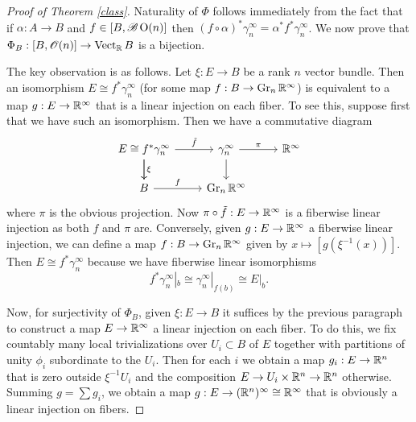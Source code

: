 \documentclass{amsart}
\DeclareMathOperator{\Vect}{Vect}
\begin{document}

\begin{proof}[Proof of Theorem \ref{class}]
    Naturality of $\Phi$ follows immediately from the fact that if $\alpha:A\to B$ and
    $f\in[B,\mathscr{B}\operatorname{O}(n)]$ then $(f\circ\alpha)^*\gamma_n^\infty=\alpha^*f^*\gamma_n^\infty$.
    We now prove that $\Phi_B:[B,\mathscr{O}(n)]\to\Vect_\R B$ is a bijection.

    The key observation is as follows.  Let $\xi:E\to B$ be a rank $n$ vector bundle. Then an isomorphism
    $E\cong f^*\gamma_n^\infty$ (for some map $f:B\to\operatorname{Gr}_n\mathbb{R}^\infty$) is equivalent to a map
    $g:E\to\mathbb{R}^\infty$ that is a linear injection on each fiber. To see this, suppose first that we have
    such an isomorphism. Then we have a commutative diagram
    \begin{equation*}
        \begin{tikzcd}
            E\ar{d}{\xi}\cong f^*\gamma_n^\infty\ar{d}\ar{r}{\tilde f}&\gamma_n^\infty\ar{r}{\pi}\ar{d} & \R^\infty\\
            B\ar{r}{f} & \Gr_n\R^\infty
        \end{tikzcd}
    \end{equation*}
    where $\pi$ is the obvious projection. Now $\pi\circ\tilde f:E\to\mathbb{R}^\infty$ is a fiberwise linear
    injection as both $f$ and $\pi$ are. Conversely, given $g:E\to\mathbb{R}^\infty$ a fiberwise linear
    injection, we can define a map $f:B\to\operatorname{Gr}_n\mathbb{R}^\infty$ given by $x\mapsto [g(\xi^{-1}(x))]$.
    Then $E\cong f^*\gamma_n^\infty$ because we have fiberwise linear isomorphisms
    \begin{equation*}
        f^*\gamma_n^\infty|_b \cong \gamma_n^\infty|_{f(b)}\cong E|_b.
    \end{equation*}

    Now, for surjectivity of $\Phi_B$, given $\xi:E\to B$ it suffices by the previous paragraph to
    construct a map $E\to\mathbb{R}^\infty$ a linear injection on each fiber. To do this, we fix countably
    many local trivializations over $U_i\subset B$ of $E$ together with partitions of unity $\phi_i$
    subordinate to the $U_i$. Then for each $i$ we obtain a map $g_i:E\to\mathbb{R}^n$ that is zero outside
    $\xi^{-1}U_i$ and the composition $E\to U_i\times\mathbb{R}^n\to\mathbb{R}^n$ otherwise. Summing $g=\sum g_i$,
    we obtain a map $g:E\to (\mathbb{R}^n)^\infty\cong\mathbb{R}^\infty$ that is obviously a linear injection on
    fibers.


\end{proof}
\end{document}
